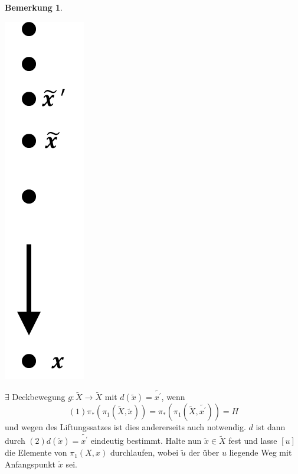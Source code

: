 \documentclass[a4paper,11pt,notitlepage]{report}
\theoremstyle{definition}
\newtheorem{remark}{Bemerkung}[chapter]
\begin{document}
\begin{remark}
\begin{center}
	 	\includegraphics[scale=0.5]{images/2011_12_22_Bild6.png}
	 \end{center}
	$\exists$ Deckbewegung $g \colon \widetilde{X} \rightarrow \widetilde{X}$ mit $d(\widetilde{x}) = \widetilde{x^\prime}$, wenn 
	$$(1) \boxed{\pi_*(\pi_1(\widetilde{X}, \widetilde{x})) = \pi_*(\pi_1(\widetilde{X}, \widetilde{x^\prime})) = H}$$
	und wegen des Liftungssatzes ist dies andererseits auch notwendig.
	\newline
	$d$ ist dann durch $(2) \boxed{d(\widetilde{x})= \widetilde{x^\prime}}$ eindeutig bestimmt.
	\newline
	Halte nun $\widetilde{x} \in \widetilde{X}$ fest und lasse $[u]$ die Elemente von $\pi_1(X,x)$ durchlaufen, wobei $\widetilde{u}$ der über $u$ liegende Weg mit Anfangspunkt $\widetilde{x}$ sei.  \begin{center}

\end{center}
\end{remark}
\end{document}
